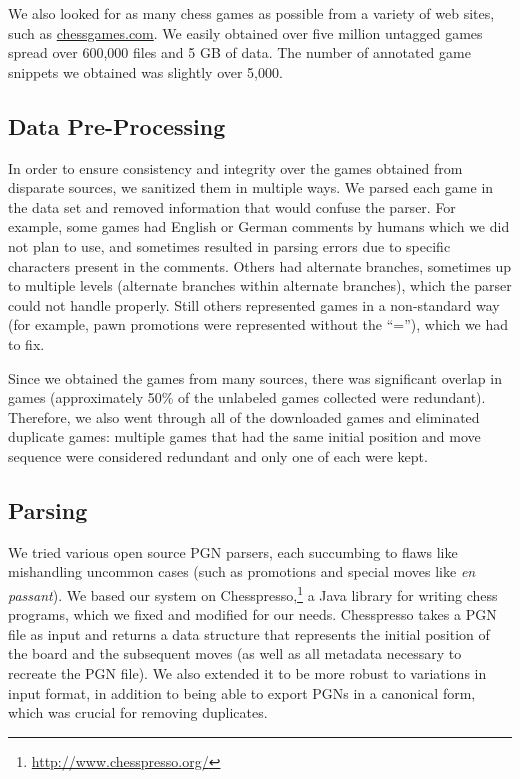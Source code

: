 \documentclass[11pt]{article}
\begin{document}
We also looked for as many chess games as possible from a variety of web sites, such as \url{chessgames.com}. We easily obtained over five million untagged games spread over 600,000 files and 5 GB of data. The number of annotated game snippets we obtained was slightly over 5,000.

\subsection{Data Pre-Processing}	
In order to ensure consistency and integrity over the games obtained from disparate sources, we sanitized them in multiple ways. We parsed each game in the data set and removed information that would confuse the parser. For example, some games had English or German comments by humans which we did not plan to use, and sometimes resulted in parsing errors due to specific characters present in the comments. Others had alternate branches, sometimes up to multiple levels (alternate branches within alternate branches), which the parser could not handle properly. Still others represented games in a non-standard way (for example, pawn promotions were represented without the ``=''), which we had to fix. 

Since we obtained the games from many sources, there was significant overlap in games (approximately 50\% of the unlabeled games collected were redundant). Therefore, we also went through all of the downloaded games and eliminated duplicate games: multiple games that had the same initial position and move sequence were considered redundant and only one of each were kept.

\subsection{Parsing}
We tried various open source PGN parsers, each succumbing to flaws like mishandling uncommon cases (such as  promotions and special moves like \emph{en passant}). We based our system on Chesspresso,\footnote{\url{http://www.chesspresso.org/}} a Java library for writing chess programs, which we fixed and modified for our needs. Chesspresso takes a PGN file as input and returns a data structure that represents the initial position of the board and the subsequent moves (as well as all metadata necessary to recreate the PGN file). We also extended it to be more robust to variations in input format, in addition to being able to export PGNs in a canonical form, which was crucial for removing duplicates.
\end{document}
